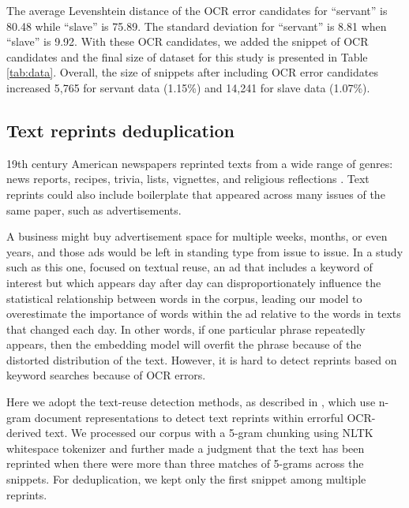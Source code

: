 \documentclass[11pt]{article}
\begin{document}
The average Levenshtein distance \citep{levenshtein_binary_1966} of the OCR error candidates for ``servant'' is 80.48 while ``slave'' is 75.89. 
The standard deviation for ``servant'' is 8.81 when ``slave'' is 9.92. 
With these OCR candidates, we added the snippet of OCR candidates and the final size of dataset for this study is presented in Table \ref{tab:data}. 
Overall, the size of snippets after including OCR error candidates increased 5,765 for servant data (1.15\%) and 14,241 for slave data (1.07\%).    

\subsection{Text reprints deduplication} \label{text reprints deduplication}
19th century American newspapers reprinted texts from a wide range of genres: news reports, recipes, trivia, lists, vignettes, and religious reflections \citep{cordell__2017}. 
Text reprints could also include boilerplate that appeared across many issues of the same paper, such as advertisements. 

A business might buy advertisement space for multiple weeks, months, or even years, and those ads would be left in standing type from issue to issue. 
In a study such as this one, focused on textual reuse, an ad that includes a keyword of interest but which appears day after day can disproportionately influence the statistical relationship between words in the corpus, leading our model to overestimate the importance of words within the ad relative to the words in texts that changed each day. In other words, if one particular phrase repeatedly appears, then the embedding model will overfit the phrase because of the distorted distribution of the text. However, it is hard to detect reprints based on keyword searches because of OCR errors. 

Here we adopt the text-reuse detection methods, as described in \citet{smith_detecting_2014} , which use n-gram document representations to detect text reprints within errorful OCR-derived text. 
We processed our corpus with a 5-gram chunking using NLTK whitespace tokenizer and further made a judgment that the text has been reprinted when there were more than three matches of 5-grams across the snippets. 
For deduplication, we kept only the first snippet among multiple reprints. 
\end{document}

